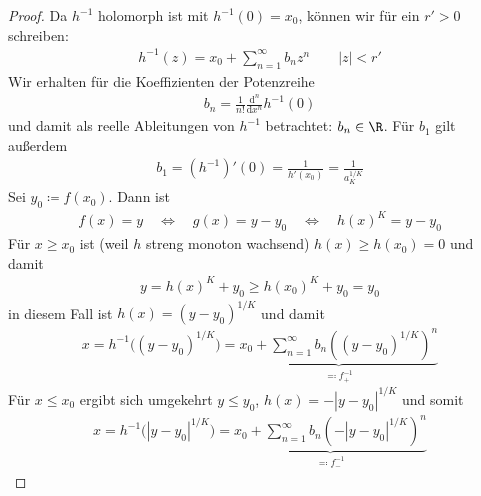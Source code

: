 \begin{theorem}[Satz]
\begin{proof}
    Da $h^{-1}$ holomorph ist mit $h^{-1}(0) = x_0$, können wir für ein $r'>0$ schreiben:
    \begin{align*}
      h^{-1}(z) = x_0 + \sum_{n=1}^\infty b_n z^n
      \qquad |z| < r'
    \end{align*}
    Wir erhalten für die Koeffizienten der Potenzreihe
    \begin{align*}
      b_n = \frac 1{n!} \frac{\mathrm d^n}{\mathrm dx^n} h^{-1}(0)
    \end{align*}
    und damit als reelle Ableitungen von $h^{-1}$ betrachtet: $b_n \in \R$.
    Für $b_1$ gilt außerdem
    \begin{align*}
      b_1 = (h^{-1})'(0) = \frac 1{h'(x_0)} = \frac 1{a_K^{1/K}}
    \end{align*}
    Sei $y_0 \coloneq f(x_0)$.
    Dann ist
    \begin{align*}
        f(x) = y
        \quad\iff\quad g(x) = y-y_0
        \quad\iff\quad h(x)^K = y-y_0
    \end{align*}
    Für $x \ge x_0$ ist (weil $h$ streng monoton wachsend) $h(x) \ge h(x_0) = 0$ und damit
    \begin{align*}
      y = h(x)^K + y_0 \ge h(x_0)^K + y_0 = y_0
    \end{align*}
    in diesem Fall ist $h(x) = (y-y_0)^{1/K}$ und damit
    \begin{align*}
      x = h^{-1}\Big((y-y_0)^{1/K}\Big) = \underbrace{x_0 + \sum\limits_{n=1}^{\infty} b_n \left( (y-y_0)^{1/K} \right)^n}_{\eqcolon f_{+}^{-1}}
    \end{align*}
    Für $x \le x_0$ ergibt sich umgekehrt $y \le y_0$, $h(x) = -|y-y_0|^{1/K}$ und somit
    \begin{align*}
      x = h^{-1}\Big(|y-y_0|^{1/K}\Big) = \underbrace{x_0 + \sum\limits_{n=1}^{\infty} b_n \left( -|y-y_0|^{1/K} \right)^n}_{\eqcolon f_{-}^{-1}}
    \end{align*}
  \end{proof}
\end{theorem}

